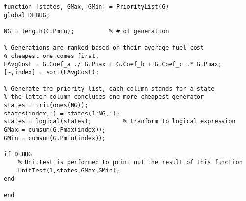 \begin{verbatim}
function [states, GMax, GMin] = PriorityList(G)
global DEBUG;

NG = length(G.Pmin);          % # of generation

% Generations are ranked based on their average fuel cost
% cheapest one comes first.
FAvgCost = G.Coef_a ./ G.Pmax + G.Coef_b + G.Coef_c .* G.Pmax;
[~,index] = sort(FAvgCost);

% Generate the priority list, each column stands for a state
% the latter column concludes one more cheapest generator
states = triu(ones(NG));
states(index,:) = states(1:NG,:);
states = logical(states);         % tranform to logical expression
GMax = cumsum(G.Pmax(index));
GMin = cumsum(G.Pmin(index));

if DEBUG
    % Unittest is performed to print out the result of this function
    UnitTest(1,states,GMax,GMin);
end

end
\end{verbatim}
    
